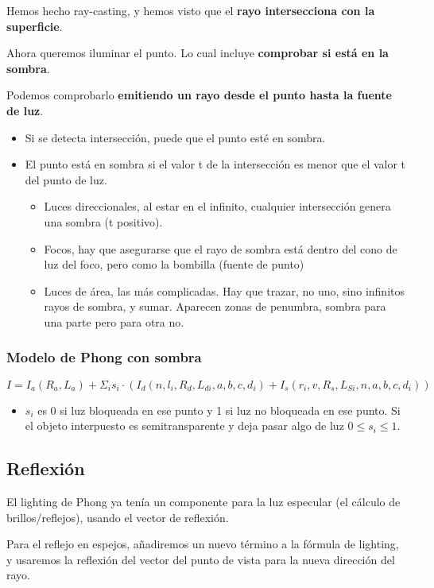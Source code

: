 Hemos hecho ray-casting, y hemos visto que el \textbf{rayo intersecciona con la superficie}.

Ahora queremos iluminar el punto. Lo cual incluye \textbf{comprobar si está en la sombra}.

Podemos comprobarlo \textbf{emitiendo un rayo desde el punto hasta la fuente de luz}.
\begin{itemize}
	\item Si se detecta intersección, puede que el punto esté en sombra.
	\item El punto está en sombra si el valor t de la intersección es menor que el valor t del punto de luz.
	      \begin{itemize}
		      \item Luces direccionales, al estar en el infinito, cualquier intersección genera una sombra (t positivo).
		      \item Focos, hay que asegurarse que el rayo de sombra está dentro del cono de luz del foco, pero como la bombilla (fuente de punto)
		      \item Luces de área, las más complicadas. Hay que trazar, no uno, sino infinitos rayos de sombra, y sumar. Aparecen zonas de penumbra, sombra para una parte pero para otra no.
	      \end{itemize}
\end{itemize}

\subsubsection{Modelo de Phong con sombra}
$I=I_a(R_a,L_a)+\Sigma_i s_i \cdot (I_d(n, l_i, R_d, L_{di}, a, b, c, d_i)+I_s(r_i,v, R_s, L_{Si}, n, a, b, c, d_i))$
\begin{itemize}
	\item $s_i$ es 0 si luz bloqueada en ese punto y 1 si luz no bloqueada en ese punto. Si el objeto interpuesto es semitransparente y deja pasar algo de luz $0 \leq s_i \leq 1$.
\end{itemize}

\subsection{Reflexión}
El lighting de Phong ya tenía un componente para la luz especular (el cálculo de brillos/reflejos), usando el vector de reflexión.

Para el reflejo en espejos, añadiremos un nuevo término a la fórmula de lighting, y usaremos la reflexión del vector del punto de vista para la nueva dirección del rayo.

